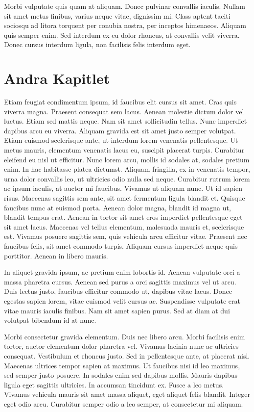 \documentclass[a4paper,10pt]{article}
\begin{document}
Morbi vulputate quis quam at aliquam. Donec pulvinar convallis iaculis. Nullam sit amet metus finibus, varius neque vitae, dignissim mi. Class aptent taciti sociosqu ad litora torquent per conubia nostra, per inceptos himenaeos. Aliquam quis semper enim. Sed interdum ex eu dolor rhoncus, at convallis velit viverra. Donec cursus interdum ligula, non facilisis felis interdum eget.
\section{Andra Kapitlet}
Etiam feugiat condimentum ipsum, id faucibus elit cursus sit amet. Cras quis viverra magna. Praesent consequat sem lacus. Aenean molestie dictum dolor vel luctus. Etiam sed mattis neque. Nam sit amet sollicitudin tellus. Nunc imperdiet dapibus arcu eu viverra. Aliquam gravida est sit amet justo semper volutpat. Etiam euismod scelerisque ante, ut interdum lorem venenatis pellentesque. Ut metus mauris, elementum venenatis lacus eu, suscipit placerat turpis. Curabitur eleifend eu nisl ut efficitur. Nunc lorem arcu, mollis id sodales at, sodales pretium enim. In hac habitasse platea dictumst. Aliquam fringilla, ex in venenatis tempor, urna dolor convallis leo, ut ultricies odio nulla sed neque. Curabitur rutrum lorem ac ipsum iaculis, at auctor mi faucibus.
Vivamus ut aliquam nunc. Ut id sapien risus. Maecenas sagittis sem ante, sit amet fermentum ligula blandit et. Quisque faucibus nunc at euismod porta. Aenean dolor magna, blandit id magna ut, blandit tempus erat. Aenean in tortor sit amet eros imperdiet pellentesque eget sit amet lacus. Maecenas vel tellus elementum, malesuada mauris et, scelerisque est. Vivamus posuere sagittis sem, quis vehicula arcu efficitur vitae. Praesent nec faucibus felis, sit amet commodo turpis. Aliquam cursus imperdiet neque quis porttitor. Aenean in libero mauris.

In aliquet gravida ipsum, ac pretium enim lobortis id. Aenean vulputate orci a massa pharetra cursus. Aenean sed purus a orci sagittis maximus vel ut arcu. Duis lectus justo, faucibus efficitur commodo ut, dapibus vitae lacus. Donec egestas sapien lorem, vitae euismod velit cursus ac. Suspendisse vulputate erat vitae mauris iaculis finibus. Nam sit amet sapien purus. Sed at diam at dui volutpat bibendum id at nunc.

Morbi consectetur gravida elementum. Duis nec libero arcu. Morbi facilisis enim tortor, auctor elementum dolor pharetra vel. Vivamus lacinia nunc ac ultricies consequat. Vestibulum et rhoncus justo. Sed in pellentesque ante, at placerat nisl. Maecenas ultrices tempor sapien at maximus. Ut faucibus nisi id leo maximus, sed semper justo posuere. In sodales enim sed dapibus mollis. Mauris dapibus ligula eget sagittis ultricies. In accumsan tincidunt ex. Fusce a leo metus. Vivamus vehicula mauris sit amet massa aliquet, eget aliquet felis blandit. Integer eget odio arcu. Curabitur semper odio a leo semper, at consectetur mi aliquam.
\end{document}
